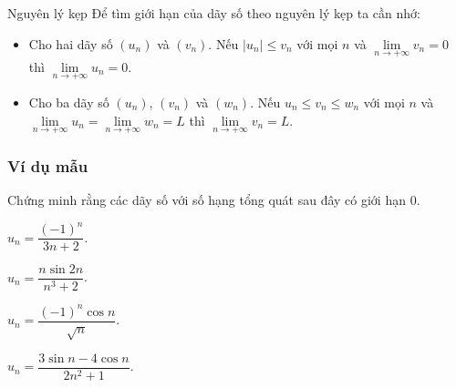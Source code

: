 
\begin{dang}{Nguyên lý kẹp}
		Để tìm giới hạn của dãy số theo nguyên lý kẹp ta cần nhớ:
	\begin{itemize}
		\item Cho hai dãy số $(u_n)$ và $(v_n)$. Nếu $|u_n| \leq v_n$ với mọi $n$ và $\lim \limits_{n \to +\infty}v_n = 0$ thì $\lim \limits_{n \to +\infty}u_n =0$.
		\item Cho ba dãy số $(u_n)$, $(v_n)$ và $(w_n)$. Nếu $ u_n \leq v_n \leq w_n$ với mọi $n$ và $\lim \limits_{n \to +\infty}u_n = \lim \limits_{n \to +\infty}w_n = L$ thì $\lim \limits_{n \to +\infty}v_n = L$.
	\end{itemize}
\end{dang}
\subsubsection{Ví dụ mẫu}
\begin{vd}%
	Chứng minh rằng các dãy số với số hạng tổng quát sau đây có giới hạn $0$.
	\begin{enumEX}[a)]{2}
		\item $u_n=\dfrac{(-1)^n}{3n+2}$.
		\item $u_n=\dfrac{n\sin 2n}{n^3+2}$.
		\item $u_n=\dfrac{(-1)^n\cos n}{\sqrt{n}}$.
		\item $u_n=\dfrac{3\sin n-4\cos n}{2n^2+1}$.
	\end{enumEX}
\end{vd}
